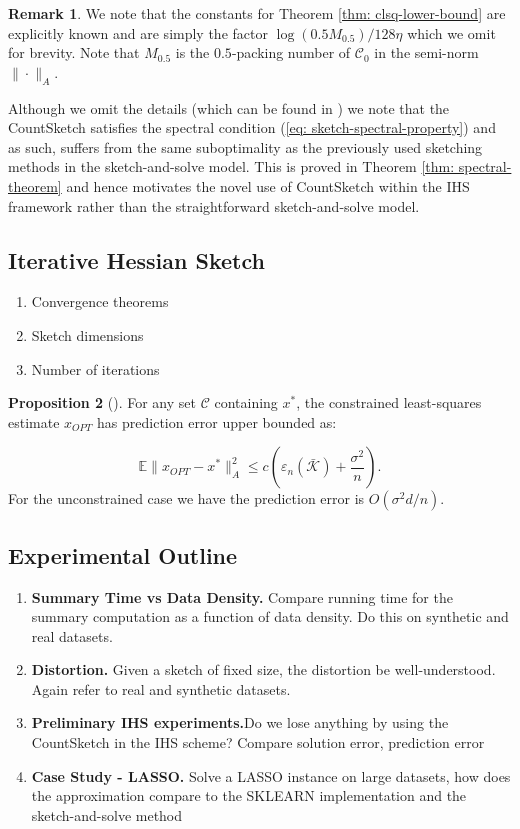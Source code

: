 \documentclass[twoside]{article}
\newcommand{\E}{\mathbb{E}}
\newcommand{\eps}{\varepsilon}
\theoremstyle{definition}\newtheorem{thm}{Theorem}[section]
\theoremstyle{definition}\newtheorem{mydef}[thm]{Definition}
\theoremstyle{definition}\newtheorem{rem}[thm]{Remark}
\theoremstyle{definition}\newtheorem{prop}[thm]{Proposition}
\theoremstyle{definition}\newtheorem{example}[thm]{Example}
\theoremstyle{definition}\newtheorem{claim}[thm]{Claim}
\theoremstyle{definition}\newtheorem{Qu}[thm]{Question}
\theoremstyle{definition}\newtheorem{Lemma}[thm]{Lemma}
\theoremstyle{definition}\newtheorem{Cor}[thm]{Corollary}
\theoremstyle{definition}\newtheorem{Fact}[]{Fact}
\begin{document}
\begin{rem}
  We note that the constants for Theorem \ref{thm: clsq-lower-bound} are
  explicitly known and are simply the factor $\log(0.5 M_{0.5})/128\eta$
  which we omit for brevity.
  Note that $M_{0.5}$ is the $0.5$-packing number of $\mathcal{C}_0$ in
  the semi-norm $\| \cdot \|_A$.
\end{rem}
Although we omit the details (which can be found in \cite{pilanci2016iterative})
we note that the CountSketch satisfies the spectral condition (\ref{eq: sketch-spectral-property})
and as such, suffers from the same suboptimality as the previously used
sketching methods in the sketch-and-solve model.
This is proved in Theorem \ref{thm: spectral-theorem} and hence motivates the
novel use of CountSketch within the IHS framework rather than the straightforward
sketch-and-solve model.

\subsection{Iterative Hessian Sketch}
\begin{enumerate}
  \item{Convergence theorems}
  \item{Sketch dimensions}
  \item{Number of iterations}
\end{enumerate}

\begin{prop}[\cite{pilanci2016iterative}] \label{prop: ihs-error-bound}
  For any set $\mathcal{C}$ containing $x^*$, the constrained least-squares
  estimate $x_{OPT}$ has prediction error upper bounded as:

  \begin{equation}
    \E \|x_{OPT} - x^* \|_A^2 \le c \left(\eps_n(\mathcal{\bar{K}}) +
    \frac{\sigma^2}{n}\right).
  \end{equation}
  For the unconstrained case we have the prediction error is $O(\sigma^2 d/n)$.
\end{prop}



\subsection{Experimental Outline}

\begin{enumerate}
  \item{\textbf{Summary Time vs Data Density.}  Compare running time for the
  summary computation as a function of data density.
  Do this on synthetic and real datasets.}
  \item{\textbf{Distortion.}  Given a sketch of fixed size, the distortion be
  well-understood.  Again refer to real and synthetic datasets.}
  \item{\textbf{Preliminary IHS experiments.}Do we lose anything by using the
  CountSketch in the IHS scheme? Compare solution error, prediction error}
  \item{\textbf{Case Study - LASSO.} Solve a LASSO
  instance on large datasets, how does the approximation compare to the SKLEARN
  implementation and the sketch-and-solve method}
\end{enumerate}
\end{document}
